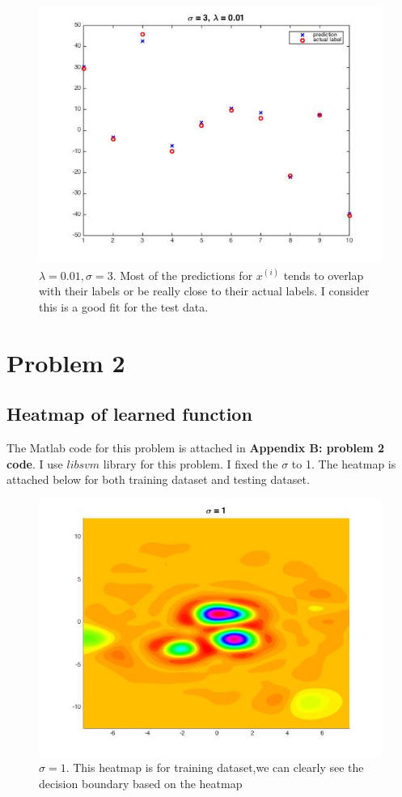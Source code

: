 \documentclass[twoside]{article}
\theoremstyle{definition}
\theoremstyle{definition}
\theoremstyle{remark}
\begin{document}
\begin{figure}[H]
\centering
\includegraphics[width=120mm]{problem1Pic6.jpg}
\caption{ $\lambda =0.01, \sigma = 3$.  Most of the predictions for $x^{(i)}$ tends to overlap with their labels or be really close to their actual labels. I consider this is a good fit for the test data. \label{problem1Pic2}}
\end{figure}

\section{Problem 2}
\subsection{Heatmap of learned function}
The Matlab code for this problem is attached in \textbf{Appendix B: problem 2 code}. I use $libsvm$ library for this problem. I fixed the $\sigma$ to 1. The heatmap is attached below for both training dataset and testing dataset.
  
\begin{figure}[H]
\centering
\includegraphics[width=120mm]{sigma_1.jpg}
\caption{ $\sigma = 1$. This heatmap is for training dataset,we can clearly see the decision boundary based on the heatmap\label{problem2Pic1}}
\end{figure}
\end{document}
